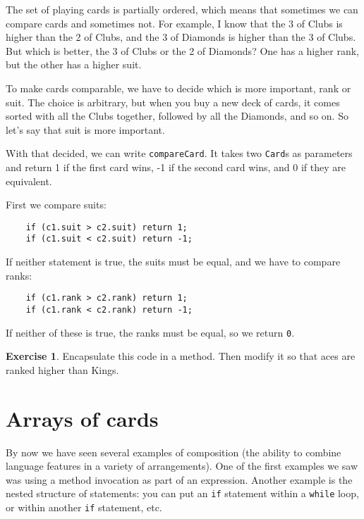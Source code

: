 \documentclass[12pt]{book}
\theoremstyle{definition}
\newtheorem{excz}{Exercise}[chapter]
\newenvironment{exercise}{\bigskip\begin{excz}\mbox{}}{\end{excz}}
\begin{document}
The set of playing cards is partially ordered, which means that
sometimes we can compare cards and sometimes not.  For example, I know
that the 3 of Clubs is higher than the 2 of Clubs, and the 3 of
Diamonds is higher than the 3 of Clubs.  But which is better, the 3 of
Clubs or the 2 of Diamonds?  One has a higher rank, but the other has
a higher suit.

To make cards comparable, we have to decide which is more
important, rank or suit.  The choice is
arbitrary, but when you buy a new deck of cards, it comes sorted
with all the Clubs together, followed by all the Diamonds, and so on.
So let's say that suit is more important.

With that decided, we can write {\tt compareCard}.  It
takes two {\tt Card}s as parameters and return 1 if
the first card wins, -1 if the second card wins, and 0 if
they are equivalent.

First we compare suits:

\begin{lstlisting}
    if (c1.suit > c2.suit) return 1;
    if (c1.suit < c2.suit) return -1;
\end{lstlisting}
%
If neither statement is true, the suits must be equal,
and we have to compare ranks:

\begin{lstlisting}
    if (c1.rank > c2.rank) return 1;
    if (c1.rank < c2.rank) return -1;
\end{lstlisting}
%
If neither of these is true, the ranks must be equal,
so we return {\tt 0}.

\begin{exercise}
Encapsulate this code in a method.
Then modify it so that aces are ranked higher than Kings.
\end{exercise}


\section{Arrays of cards}
\label{cardarray}

By now we have seen several examples of composition (the ability to
combine language features in a variety of arrangements).  One of the
first examples we saw was using a method invocation as part of an
expression.  Another example is the nested structure of statements:
you can put an {\tt if} statement within a {\tt while} loop, or within
another {\tt if} statement, etc.
\end{document}
